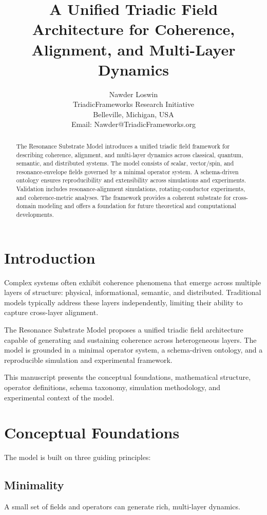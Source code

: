 \documentclass[12pt]{article}
\title{\textbf{A Unified Triadic Field Architecture for Coherence, Alignment, and Multi-Layer Dynamics}}
\author{
Nawder Loswin \\
\small TriadicFrameworks Research Initiative \\
\small Belleville, Michigan, USA \\
\small Email: Nawder@TriadicFrameworks.org
}
\date{}
\begin{document}
\maketitle

\begin{abstract}
The Resonance Substrate Model introduces a unified triadic field framework for describing coherence, alignment, and multi-layer dynamics across classical, quantum, semantic, and distributed systems. The model consists of scalar, vector/spin, and resonance-envelope fields governed by a minimal operator system. A schema-driven ontology ensures reproducibility and extensibility across simulations and experiments. Validation includes resonance-alignment simulations, rotating-conductor experiments, and coherence-metric analyses. The framework provides a coherent substrate for cross-domain modeling and offers a foundation for future theoretical and computational developments.
\end{abstract}

\section{Introduction}

Complex systems often exhibit coherence phenomena that emerge across multiple layers of structure: physical, informational, semantic, and distributed. Traditional models typically address these layers independently, limiting their ability to capture cross-layer alignment.

The Resonance Substrate Model proposes a unified triadic field architecture capable of generating and sustaining coherence across heterogeneous layers. The model is grounded in a minimal operator system, a schema-driven ontology, and a reproducible simulation and experimental framework.

This manuscript presents the conceptual foundations, mathematical structure, operator definitions, schema taxonomy, simulation methodology, and experimental context of the model.

\section{Conceptual Foundations}

The model is built on three guiding principles:

\subsection{Minimality}
A small set of fields and operators can generate rich, multi-layer dynamics.
\end{document}
